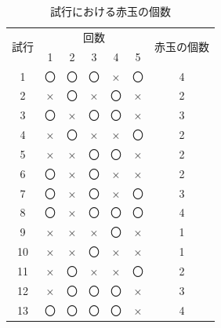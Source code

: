 \documentclass[12pt]{jarticle}
\begin{document}
\clearpage
\begin{table}
    \begin{center}
        \caption{試行における赤玉の個数}
        \begin{tabular}[h]{|c|c|c|c|c|c|c|}
            \hline
            \multirow{2}{*}{試行} & \multicolumn{5}{|c|}{回数} & \multirow{2}{*}{赤玉の個数}                    \\
            \cline{2-6}
                                  & 1                          & 2                           & 3  & 4  & 5  &   \\
            \hline
            1                     & 〇                         & 〇                          & 〇 & ×  & 〇 & 4 \\
            2                     & ×                          & 〇                          & ×  & 〇 & ×  & 2 \\
            3                     & 〇                         & ×                           & 〇 & 〇 & ×  & 3 \\
            4                     & ×                          & 〇                          & ×  & ×  & 〇 & 2 \\
            5                     & ×                          & ×                           & 〇 & 〇 & ×  & 2 \\
            6                     & 〇                         & ×                           & 〇 & ×  & ×  & 2 \\
            7                     & 〇                         & ×                           & 〇 & ×  & 〇 & 3 \\
            8                     & 〇                         & ×                           & 〇 & 〇 & 〇 & 4 \\
            9                     & ×                          & ×                           & ×  & 〇 & ×  & 1 \\
            10                    & ×                          & ×                           & 〇 & ×  & ×  & 1 \\
            11                    & ×                          & 〇                          & ×  & ×  & 〇 & 2 \\
            12                    & ×                          & 〇                          & 〇 & 〇 & ×  & 3 \\
            13                    & 〇                         & 〇                          & 〇 & 〇 & ×  & 4 \\

\end{tabular}
\end{center}
\end{table}
\end{document}
